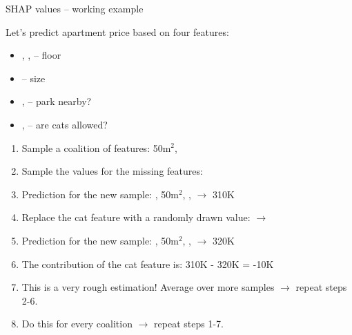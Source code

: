 
\begin{frame}{SHAP values -- working example}
    \footnotesize
    \begin{minipage}{0.33\textwidth}
        Let's predict apartment price based on four features:
        
        \begin{itemize}
            \item {\NotoEmoji {}}, {\NotoEmoji {}}, {\NotoEmoji {}} -- floor
            \item {\NotoEmoji {}} -- size
            \item {\NotoEmoji {}}, {\NotoEmoji {}} --  park nearby?
            \item {\NotoEmoji {}}, {\NotoEmoji {}} -- are cats allowed?
        \end{itemize}
        
        
    \end{minipage} 
    \begin{minipage}{0.65\textwidth}
    \begin{enumerate}
        \item<4-> Sample a coalition of features: {\NotoEmoji {}}50m\(^2\), {\NotoEmoji {}}
        \item<5-> Sample the values for the missing features: {\NotoEmoji {}}
        \item<6-> Prediction for the new sample: {\NotoEmoji {}}, {\NotoEmoji {}}50m\(^2\), {\NotoEmoji {}}, {\NotoEmoji {}} $\rightarrow$ 310K
        \item<7-> Replace the cat feature with a randomly drawn value: {\NotoEmoji {}} $\rightarrow$ {\NotoEmoji {}}
        \item<8-> Prediction for the new sample: {\NotoEmoji {}}, {\NotoEmoji {}}50m\(^2\), {\NotoEmoji {}}, {\NotoEmoji {}} $\rightarrow$ 320K
        \item<9-> The contribution of the cat feature is: 310K - 320K = -10K
        \item<10-> This is a very rough estimation! Average over more samples $\rightarrow$ repeat steps 2-6.
        \item<11-> Do this for every coalition $\rightarrow$ repeat steps 1-7.
    \end{enumerate}
    \end{minipage}


\end{frame}
